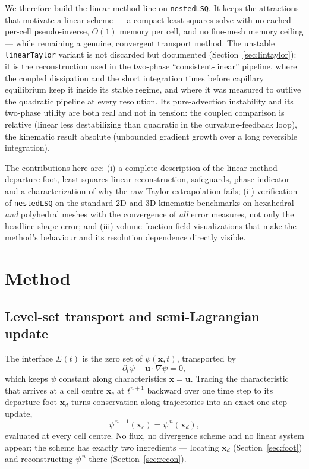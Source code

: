 \documentclass[preprint,3p,11pt]{elsarticle}
\newcommand{\psilev}{\psi}
\newcommand{\uvec}{\mathbf{u}}
\newcommand{\xc}{\mathbf{x}_c}
\newcommand{\xd}{\mathbf{x}_d}
\begin{document}
We therefore build the linear method line on \texttt{nestedLSQ}. It keeps the
attractions that motivate a linear scheme --- a compact least-squares solve
with no cached per-cell pseudo-inverse, $O(1)$ memory per cell, and no
fine-mesh memory ceiling --- while remaining a genuine, convergent transport
method. The unstable \texttt{linearTaylor} variant is not discarded but
documented (Section~\ref{sec:lintaylor}): it is the reconstruction used in the
two-phase ``consistent-linear'' pipeline, where the coupled dissipation and
the short integration times before capillary equilibrium keep it inside its
stable regime, and where it was measured to outlive the quadratic pipeline at
every resolution. Its pure-advection instability and its two-phase utility are
both real and not in tension: the coupled comparison is relative (linear less
destabilizing than quadratic in the curvature-feedback loop), the kinematic
result absolute (unbounded gradient growth over a long reversible integration).

The contributions here are: (i) a complete description of the linear method
--- departure foot, least-squares linear reconstruction, safeguards, phase
indicator --- and a characterization of why the raw Taylor extrapolation
fails; (ii) verification of \texttt{nestedLSQ} on the standard 2D and 3D
kinematic benchmarks \cite{rider1998,leveque1996,enright2002,liovic2006} on
hexahedral \emph{and} polyhedral \cite{juretic_cfmesh} meshes with the
convergence of \emph{all} error measures, not only the headline shape error;
and (iii) volume-fraction field visualizations that make the method's
behaviour and its resolution dependence directly visible.

\section{Method}
\label{sec:method}

\subsection{Level-set transport and semi-Lagrangian update}
The interface $\Sigma(t)$ is the zero set of $\psilev(\mathbf{x},t)$,
transported by
\begin{equation}
  \partial_t \psilev + \uvec\cdot\nabla\psilev = 0 ,
  \label{eq:levelset}
\end{equation}
which keeps $\psilev$ constant along characteristics
$\dot{\mathbf{x}}=\uvec$. Tracing the characteristic that arrives at a cell
centre $\xc$ at $t^{n+1}$ backward over one time step to its departure foot
$\xd$ turns conservation-along-trajectories into an exact one-step update,
\begin{equation}
  \psilev^{\,n+1}(\xc) = \psilev^{\,n}(\xd),
  \label{eq:sl}
\end{equation}
evaluated at every cell centre. No flux, no divergence scheme and no linear
system appear; the scheme has exactly two ingredients --- locating $\xd$
(Section~\ref{sec:foot}) and reconstructing $\psilev^{\,n}$ there
(Section~\ref{sec:recon}).
\end{document}
